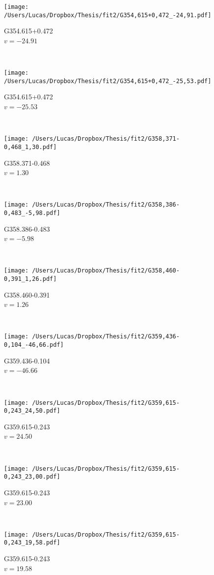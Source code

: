 \begin{figure*}[t]\ContinuedFloat
	\centering
	\begin{subfigure}[t]{0.3\textwidth}
		\texttt{[image: /Users/Lucas/Dropbox/Thesis/fit2/G354,615+0,472\_-24,91.pdf]}
		\caption[]{G354.615+0.472\\$v=-24.91$\,\kms}
	\end{subfigure}
	~
	\begin{subfigure}[t]{0.3\textwidth}
		\texttt{[image: /Users/Lucas/Dropbox/Thesis/fit2/G354,615+0,472\_-25,53.pdf]}
		\caption[]{G354.615+0.472\\$v=-25.53$\,\kms}
	\end{subfigure}
	~
	\begin{subfigure}[t]{0.3\textwidth}
		\texttt{[image: /Users/Lucas/Dropbox/Thesis/fit2/G358,371-0,468\_1,30.pdf]}
		\caption[]{G358.371-0.468\\$v=1.30$\,\kms}
	\end{subfigure}
	~
	\begin{subfigure}[t]{0.3\textwidth}
		\texttt{[image: /Users/Lucas/Dropbox/Thesis/fit2/G358,386-0,483\_-5,98.pdf]}
		\caption[]{G358.386-0.483\\$v=-5.98$\,\kms}
	\end{subfigure}
	~
	\begin{subfigure}[t]{0.3\textwidth}
		\texttt{[image: /Users/Lucas/Dropbox/Thesis/fit2/G358,460-0,391\_1,26.pdf]}
		\caption[]{G358.460-0.391\\$v=1.26$\,\kms}
	\end{subfigure}
	~
	\begin{subfigure}[t]{0.3\textwidth}
		\texttt{[image: /Users/Lucas/Dropbox/Thesis/fit2/G359,436-0,104\_-46,66.pdf]}
		\caption[]{G359.436-0.104\\$v=-46.66$\,\kms}
	\end{subfigure}
	~
	\begin{subfigure}[t]{0.3\textwidth}
		\texttt{[image: /Users/Lucas/Dropbox/Thesis/fit2/G359,615-0,243\_24,50.pdf]}
		\caption[]{G359.615-0.243\\$v=24.50$\,\kms}
	\end{subfigure}
	~
	\begin{subfigure}[t]{0.3\textwidth}
		\texttt{[image: /Users/Lucas/Dropbox/Thesis/fit2/G359,615-0,243\_23,00.pdf]}
		\caption[]{G359.615-0.243\\$v=23.00$\,\kms}
	\end{subfigure}
	~
	\begin{subfigure}[t]{0.3\textwidth}
		\texttt{[image: /Users/Lucas/Dropbox/Thesis/fit2/G359,615-0,243\_19,58.pdf]}
		\caption[]{G359.615-0.243\\$v=19.58$\,\kms}
	\end{subfigure}
\end{figure*}
\clearpage


